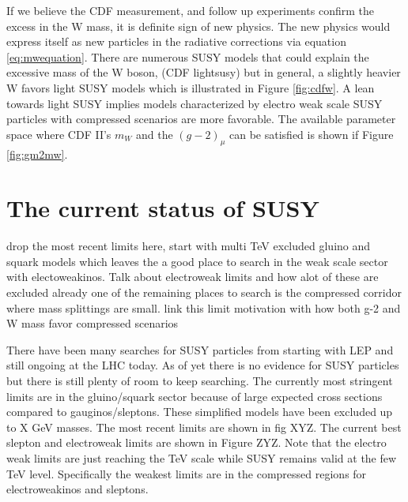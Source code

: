 If we believe the CDF measurement, and follow up experiments confirm the excess in the W mass, it is definite sign of new physics. The new physics would express itself as new particles in the radiative corrections via equation \ref{eq:mwequation}. There are numerous SUSY models that could explain the excessive mass of the W boson, (CDF lightsusy) but in general, a slightly heavier W favors light SUSY models which is illustrated in Figure \ref{fig:cdfw}. A lean towards light SUSY implies models characterized by electro weak scale SUSY particles with compressed scenarios are more favorable. The available parameter space where CDF II's $m_W$ and the $(g-2)_\mu$ can be satisfied is shown if Figure \ref{fig:gm2mw}.
\section{The current status of SUSY}
drop the most recent limits here, start with multi TeV excluded gluino and squark models which leaves the a good place to search in the weak scale sector with electoweakinos. Talk about electroweak limits and how alot of these are excluded already one of the remaining places to search is the compressed corridor where mass splittings are small. link this limit motivation with how both g-2 and W mass favor compressed scenarios

There have been many searches for SUSY particles from starting with LEP and still ongoing at the LHC today. As of yet there is no evidence for SUSY particles but there is still plenty of room to keep searching. The currently most stringent limits are in the gluino/squark sector because of large expected cross sections compared to gauginos/sleptons. These simplified models have been excluded up to X GeV masses. The most recent limits are shown in fig XYZ.  The current best slepton and electroweak limits are shown in Figure ZYZ. Note that the electro weak limits are just reaching the TeV scale while SUSY remains valid at the few TeV level. Specifically the weakest limits are in the compressed regions for electroweakinos and sleptons. 



